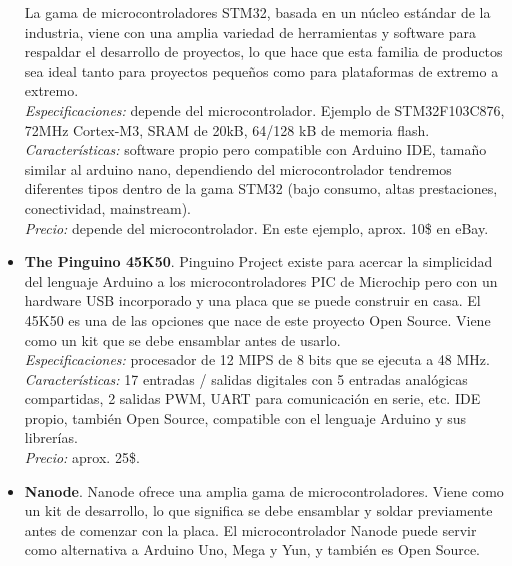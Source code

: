 \documentclass[12pt]{article}
\begin{document}
\begin{itemize}
		La gama de microcontroladores STM32, basada en un núcleo estándar de la industria, viene con una amplia variedad de herramientas y software para respaldar el desarrollo de proyectos, lo que hace que esta familia de productos sea ideal tanto para proyectos pequeños como para plataformas de extremo a extremo. \\
		
		\textit{Especificaciones:} depende del microcontrolador. Ejemplo de STM32F103C876, 72MHz Cortex-M3, SRAM de 20kB, 64/128 kB de memoria flash. \\
		
		\textit{Características:} software propio pero compatible con Arduino IDE, tamaño similar al arduino nano, dependiendo del microcontrolador tendremos diferentes tipos dentro de la gama STM32 (bajo consumo, altas prestaciones, conectividad, mainstream). \\
		
		\textit{Precio:} depende del microcontrolador. En este ejemplo, aprox. 10\$ en eBay. \\
		
		\item \textbf{The Pinguino 45K50}. Pinguino Project existe para acercar la simplicidad del lenguaje Arduino a los microcontroladores PIC de Microchip pero con un hardware USB incorporado y una placa que se puede construir en casa. El 45K50 es una de las opciones que nace de este proyecto Open Source.  Viene como un kit que se debe ensamblar antes de usarlo. \\
		
		\textit{Especificaciones:} procesador de 12 MIPS de 8 bits que se ejecuta a 48 MHz.\\
		
		\textit{Características:} 17 entradas / salidas digitales con 5 entradas analógicas compartidas, 2 salidas PWM, UART para comunicación en serie, etc.  IDE propio, también Open Source, compatible con el lenguaje Arduino y sus librerías.\\
		
		\textit{Precio:} aprox. 25\$.\\
		
		\item \textbf{Nanode}. Nanode ofrece una amplia gama de microcontroladores. Viene como un kit de desarrollo, lo que significa se debe ensamblar y soldar previamente antes de comenzar con la placa. 	El microcontrolador Nanode puede servir como alternativa a Arduino Uno, Mega y Yun, y también es Open Source.
		

\end{itemize}
\end{document}

